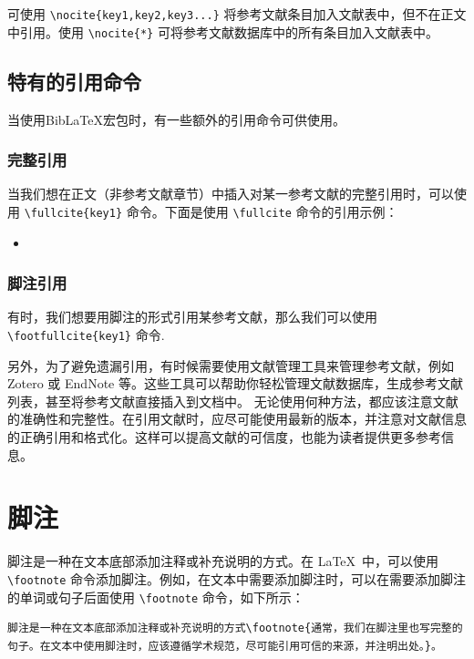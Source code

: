 可使用 \verb|\nocite{key1,key2,key3...}| 将参考文献条目加入文献表中，但不在正文中引用。使用 \verb|\nocite{*}| 可将参考文献数据库中的所有条目加入文献表中。

\ifx\fullcite\undefined
\else
\subsection{\BibLaTeX{}特有的引用命令}

当使用BibLaTeX宏包时，有一些额外的引用命令可供使用。

\subsubsection{完整引用}

当我们想在正文（非参考文献章节）中插入对某一参考文献的完整引用时，可以使用 \verb|\fullcite{key1}| 命令。下面是使用 \verb|\fullcite| 命令的引用示例：

\begin{itemize}
    \item {}
\end{itemize}

\subsubsection{脚注引用}

有时，我们想要用脚注的形式引用某参考文献，那么我们可以使用 \verb|\footfullcite{key1}| 命令.
\fi

另外，为了避免遗漏引用，有时候需要使用文献管理工具来管理参考文献，例如 Zotero 或 EndNote 等。这些工具可以帮助你轻松管理文献数据库，生成参考文献列表，甚至将参考文献直接插入到文档中。
无论使用何种方法，都应该注意文献的准确性和完整性。在引用文献时，应尽可能使用最新的版本，并注意对文献信息的正确引用和格式化。这样可以提高文献的可信度，也能为读者提供更多参考信息。

\section{脚注}

脚注是一种在文本底部添加注释或补充说明的方式。在 \LaTeX\ 中，可以使用 \verb|\footnote| 命令添加脚注。例如，在文本中需要添加脚注时，可以在需要添加脚注的单词或句子后面使用 \verb|\footnote| 命令，如下所示：

\begin{verbatim}
脚注是一种在文本底部添加注释或补充说明的方式\footnote{通常，我们在脚注里也写完整的句子。在文本中使用脚注时，应该遵循学术规范，尽可能引用可信的来源，并注明出处。}。
\end{verbatim}

